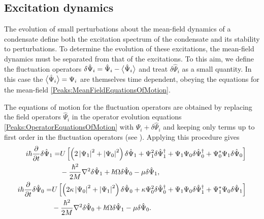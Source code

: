 \subsection{Excitation dynamics}
\label{Peaks:ExcitationDynamics}

The evolution of small perturbations about the mean-field dynamics of a condensate define both the excitation spectrum of the condensate and its stability to perturbations. 
To determine the evolution of these excitations, the mean-field dynamics must be separated from that of the excitations. To this aim, we define the fluctuation operators $\delta\hat{\Psi}_i = \hat{\Psi}_i - {\big<\hat{\Psi}_i\big>}$ and treat $\delta\hat{\Psi}_i$ as a small quantity. In this case the ${\big<\hat{\Psi}_i\big>}=\Psi_i$ are themselves time dependent, obeying the equations for the mean-field \eqref{Peaks:MeanFieldEquationsOfMotion}.

The equations of motion for the fluctuation operators are obtained by replacing the field operators $\hat{\Psi}_i$ in the operator evolution equations \eqref{Peaks:OperatorEquationsOfMotion} with $\Psi_i + \delta \hat{\Psi}_i$ and keeping only terms up to first order in the fluctuation operators (see ). Applying this procedure gives
\begin{subequations}
    \label{Peaks:FluctuationOperatorsEvolutionXSpace}
    \begin{align}
        \begin{split}
            i \hbar \frac{\partial }{\partial t}\delta \hat{\Psi}_1 =& U\left[ \left(2\abs{\Psi_1}^2+\abs{\Psi_0}^2 \right)\delta \hat{\Psi}_1 + \Psi_1^2\delta\hat{\Psi}_1^\dagger + \Psi_1\Psi_0\delta\hat{\Psi}_0^\dagger + \Psi_0^*\Psi_1\delta\hat{\Psi}_0\right]\\
                    & - \frac{\hbar^2}{2M}\nabla^2 \delta \hat{\Psi}_1 +\hbar \Omega\delta\hat{\Psi}_0- \mu \delta \hat{\Psi}_1,
        \end{split}\\
        \begin{split}
        i \hbar \frac{\partial }{\partial t}\delta \hat{\Psi}_0 =& U\left[\left(2\kappa \abs{\Psi_0}^2 +\abs{\Psi_1}^2\right)\delta\hat{\Psi}_0 + \kappa \Psi_0^2 \delta\hat{\Psi}_0^\dagger + \Psi_1\Psi_0\delta\hat{\Psi}_1^\dagger + \Psi_1^*\Psi_0\delta\hat{\Psi}_1\right]\\
                    & -\frac{\hbar^2}{2M}\nabla^2 \delta \hat{\Psi}_0 +\hbar \Omega\delta\hat{\Psi}_1 - \mu \delta\hat{\Psi}_0.
        \end{split}
    \end{align}
\end{subequations}


